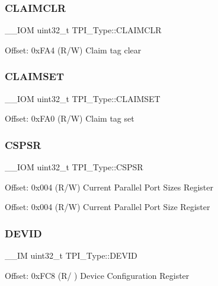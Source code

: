 \subsubsection{\texorpdfstring{C\+L\+A\+I\+M\+C\+LR}{CLAIMCLR}}
{\footnotesize\ttfamily \+\_\+\+\_\+\+I\+OM uint32\+\_\+t T\+P\+I\+\_\+\+Type\+::\+C\+L\+A\+I\+M\+C\+LR}

Offset\+: 0x\+F\+A4 (R/W) Claim tag clear \mbox{\label{struct_t_p_i___type_af8b7d15fa5252b733dd4b11fa1b5730a}} 
\subsubsection{\texorpdfstring{C\+L\+A\+I\+M\+S\+ET}{CLAIMSET}}
{\footnotesize\ttfamily \+\_\+\+\_\+\+I\+OM uint32\+\_\+t T\+P\+I\+\_\+\+Type\+::\+C\+L\+A\+I\+M\+S\+ET}

Offset\+: 0x\+F\+A0 (R/W) Claim tag set \mbox{\label{struct_t_p_i___type_a8826aa84e5806053395a742d38d59d0f}} 
\subsubsection{\texorpdfstring{C\+S\+P\+SR}{CSPSR}}
{\footnotesize\ttfamily \+\_\+\+\_\+\+I\+OM uint32\+\_\+t T\+P\+I\+\_\+\+Type\+::\+C\+S\+P\+SR}

Offset\+: 0x004 (R/W) Current Parallel Port Sizes Register

Offset\+: 0x004 (R/W) Current Parallel Port Size Register \mbox{\label{struct_t_p_i___type_abc0ecda8a5446bc754080276bad77514}} 
\subsubsection{\texorpdfstring{D\+E\+V\+ID}{DEVID}}
{\footnotesize\ttfamily \+\_\+\+\_\+\+IM uint32\+\_\+t T\+P\+I\+\_\+\+Type\+::\+D\+E\+V\+ID}

Offset\+: 0x\+F\+C8 (R/ ) Device Configuration Register


